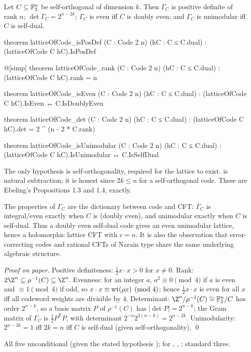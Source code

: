 \begin{theorem}\label{ch02:thm:constructionA}
Let $C\subseteq\mathbb{F}_2^n$ be self-orthogonal of dimension $k$.  Then $\Gamma_C$ is positive
definite of rank $n$; $\det\Gamma_C=2^{n-2k}$; $\Gamma_C$ is even iff $C$ is doubly even; and
$\Gamma_C$ is unimodular iff $C$ is self-dual.
\end{theorem}
\begin{leancode}
theorem latticeOfCode_isPosDef (C : Code 2 n) (hC : C ≤ C.dual) :
    (latticeOfCode C hC).IsPosDef

@[simp] theorem latticeOfCode_rank (C : Code 2 n) (hC : C ≤ C.dual) :
    (latticeOfCode C hC).rank = n

theorem latticeOfCode_isEven (C : Code 2 n) (hC : C ≤ C.dual) :
    (latticeOfCode C hC).IsEven ↔ C.IsDoublyEven

theorem latticeOfCode_det (C : Code 2 n) (hC : C ≤ C.dual) :
    (latticeOfCode C hC).det = 2 ^ (n - 2 * C.rank)

theorem latticeOfCode_isUnimodular (C : Code 2 n) (hC : C ≤ C.dual) :
    (latticeOfCode C hC).IsUnimodular ↔ C.IsSelfDual
\end{leancode}
\begin{dictionary}
The only hypothesis is self-orthogonality, required for the lattice to exist.   is natural subtraction; it is honest since $2k\le n$ for a self-orthogonal code.  These
are Ebeling's Propositions 1.3 and 1.4, exactly.
\end{dictionary}
\begin{physics}
The properties of $\Gamma_C$ are the dictionary between code and CFT: $\Gamma_C$ is integral/even exactly when $C$ is (doubly even), and unimodular exactly when $C$ is self-dual. Thus a doubly even self-dual code gives an even unimodular lattice, hence a holomorphic lattice CFT with $c=n$. It is also the observation that error-correcting codes and rational CFTs of Narain type share the same underlying algebraic structure.
\end{physics}
\emph{Proof on paper.}  Positive definiteness: $\tfrac12x\cdot x>0$ for $x\ne0$.  Rank:
$2\Z^n\subseteq\rho^{-1}(C)\subseteq\Z^n$.  Evenness: for an integer $a$, $a^2\equiv0\pmod4$ if
$a$ is even and $\equiv1\pmod 4$ if odd, so $x\cdot x\equiv\operatorname{wt}(\rho x)\pmod4$; hence
$\tfrac12x\cdot x$ is even for all $x$ iff all codeword weights are divisible by $4$.
Determinant: $\Z^n/\rho^{-1}(C)\cong\chtwoF^n/C$ has order $2^{n-k}$, so a basis matrix $P$ of
$\rho^{-1}(C)$ has $|\det P|=2^{n-k}$; the Gram matrix of $\Gamma_C$ is $\tfrac12P^{\mathsf T}P$,
with determinant $2^{-n}2^{2(n-k)}=2^{n-2k}$.  Unimodularity: $2^{n-2k}=1$ iff $2k=n$ iff $C$ is
self-dual (given self-orthogonality).  \qed
\begin{status}
All five unconditional (given the stated hypothesis );  for
, , :
standard three.
\end{status}

